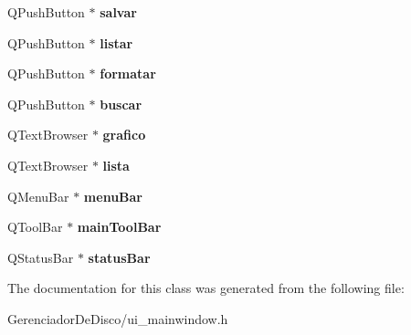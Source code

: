 \begin{DoxyCompactItemize}
\item 
\hypertarget{classUi__MainWindow_a24ed52a0e23d50390b91e9ab646ade6a}{Q\+Push\+Button $\ast$ {\bfseries salvar}}\label{classUi__MainWindow_a24ed52a0e23d50390b91e9ab646ade6a}

\item 
\hypertarget{classUi__MainWindow_a3cfcf36193deda6148cc897d603def3f}{Q\+Push\+Button $\ast$ {\bfseries listar}}\label{classUi__MainWindow_a3cfcf36193deda6148cc897d603def3f}

\item 
\hypertarget{classUi__MainWindow_a6fa54291a44a35e0ac5902da1b1b56c1}{Q\+Push\+Button $\ast$ {\bfseries formatar}}\label{classUi__MainWindow_a6fa54291a44a35e0ac5902da1b1b56c1}

\item 
\hypertarget{classUi__MainWindow_a854d97ac47fca80607e0065dafc6e173}{Q\+Push\+Button $\ast$ {\bfseries buscar}}\label{classUi__MainWindow_a854d97ac47fca80607e0065dafc6e173}

\item 
\hypertarget{classUi__MainWindow_a264cf5335b68aecd7f0ad2f9f1404e29}{Q\+Text\+Browser $\ast$ {\bfseries grafico}}\label{classUi__MainWindow_a264cf5335b68aecd7f0ad2f9f1404e29}

\item 
\hypertarget{classUi__MainWindow_affb80017316e30fd3befd35106fc2031}{Q\+Text\+Browser $\ast$ {\bfseries lista}}\label{classUi__MainWindow_affb80017316e30fd3befd35106fc2031}

\item 
\hypertarget{classUi__MainWindow_a2be1c24ec9adfca18e1dcc951931457f}{Q\+Menu\+Bar $\ast$ {\bfseries menu\+Bar}}\label{classUi__MainWindow_a2be1c24ec9adfca18e1dcc951931457f}

\item 
\hypertarget{classUi__MainWindow_a5172877001c8c7b4e0f6de50421867d1}{Q\+Tool\+Bar $\ast$ {\bfseries main\+Tool\+Bar}}\label{classUi__MainWindow_a5172877001c8c7b4e0f6de50421867d1}

\item 
\hypertarget{classUi__MainWindow_a50fa481337604bcc8bf68de18ab16ecd}{Q\+Status\+Bar $\ast$ {\bfseries status\+Bar}}\label{classUi__MainWindow_a50fa481337604bcc8bf68de18ab16ecd}

\end{DoxyCompactItemize}


The documentation for this class was generated from the following file\+:\begin{DoxyCompactItemize}
\item 
Gerenciador\+De\+Disco/ui\+\_\+mainwindow.\+h\end{DoxyCompactItemize}
